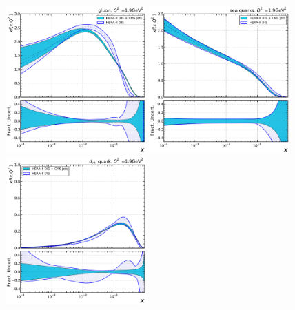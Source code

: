 \begin{figure}[tbp]
  \centering
  \includegraphics[width=0.48\textwidth]{figures/pdf_constraints/direct/HFTD_HERACMSTDJETS_V017_EIG_0_1_9.pdf}\hfill%
  \includegraphics[width=0.48\textwidth]{figures/pdf_constraints/direct/HFTD_HERACMSTDJETS_V017_EIG_9_1_9.pdf}
  \includegraphics[width=0.48\textwidth]{figures/pdf_constraints/direct/HFTD_HERACMSTDJETS_V017_EIG_7_1_9.pdf}\hfill%

\end{figure}
